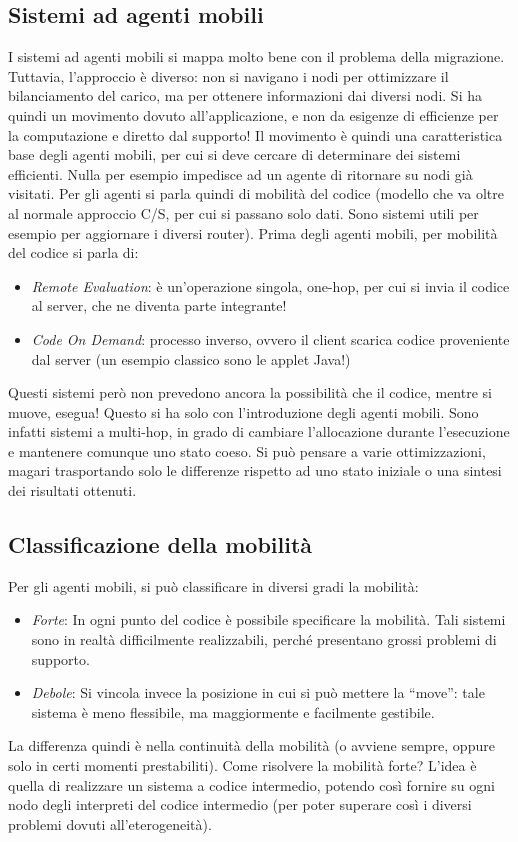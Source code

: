 \subsection{Sistemi ad agenti mobili}
I sistemi ad agenti mobili si mappa molto bene con il problema della migrazione.
Tuttavia, l'approccio è diverso: non si navigano i nodi per ottimizzare il bilanciamento del carico, ma per ottenere
informazioni dai diversi nodi. Si ha quindi un movimento dovuto all'applicazione, e non da esigenze di efficienze per la
computazione e diretto dal supporto!
Il movimento è quindi una caratteristica base degli agenti mobili, per cui si deve cercare di determinare dei sistemi
efficienti. Nulla per esempio impedisce ad un agente di ritornare su nodi già visitati.
Per gli agenti si parla quindi di mobilità del codice (modello che va oltre al normale approccio C/S, per cui si passano
solo dati. Sono sistemi utili per esempio per aggiornare i diversi router). Prima degli agenti mobili, per mobilità
del codice si parla di:
\begin{itemize}
 \item \textit{Remote Evaluation}: è un'operazione singola, one-hop, per cui si invia il codice al server, che ne
 diventa parte integrante!
 \item \textit{Code On Demand}: processo inverso, ovvero il client scarica codice proveniente dal server (un esempio
 classico sono le applet Java!)
\end{itemize}
Questi sistemi però non prevedono ancora la possibilità che il codice, mentre si muove, esegua! Questo si ha solo con
l'introduzione degli agenti mobili. Sono infatti sistemi a multi-hop, in grado di cambiare l'allocazione durante
l'esecuzione e mantenere comunque uno stato coeso. Si può pensare a varie ottimizzazioni, magari trasportando solo le
differenze rispetto ad uno stato iniziale o una sintesi dei risultati ottenuti.
\subsection{Classificazione della mobilità}
Per gli agenti mobili, si può classificare in diversi gradi la mobilità:
\begin{itemize}
 \item \textit{Forte}: In ogni punto del codice è possibile specificare la mobilità. Tali sistemi sono in realtà
 difficilmente realizzabili, perché presentano grossi problemi di supporto.
 \item \textit{Debole}: Si vincola invece la posizione in cui si può mettere la ``move'': tale sistema è meno
flessibile, ma maggiormente e facilmente gestibile.
\end{itemize}
La differenza quindi è nella continuità della mobilità (o avviene sempre, oppure solo in certi momenti prestabiliti).
Come risolvere la mobilità forte? L'idea è quella di realizzare un sistema a codice intermedio, potendo così fornire su
ogni nodo degli interpreti del codice intermedio (per poter superare così i diversi problemi dovuti all'eterogeneità).
